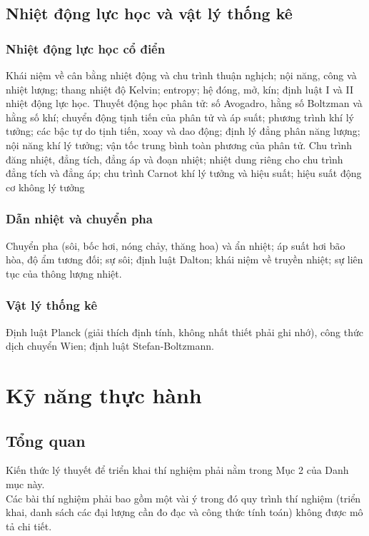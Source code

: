 \documentclass{article}
\begin{document}
\begin{multicols}{2}
\subsection{Nhiệt động lực học và vật lý thống kê}
\subsubsection{Nhiệt động lực học cổ điển}
Khái niệm về cân bằng nhiệt động và chu trình thuận nghịch; nội năng, công và nhiệt lượng; thang nhiệt độ Kelvin; entropy; hệ đóng, mở, kín; định luật I và II nhiệt động lực học. Thuyết động học phân tử: số Avogadro, hằng số Boltzman và hằng số khí; chuyển động tịnh tiến của phân tử và áp suất; phương trình khí lý tưởng; các bậc tự do tịnh tiến, xoay và dao động; định lý đẳng phân năng lượng; nội năng khí lý tưởng; vận tốc trung bình toàn phương của phân tử. Chu trình đăng nhiệt, đẳng tích, đẳng áp và đoạn nhiệt; nhiệt dung riêng cho chu trình đẳng tích và đẳng áp; chu trình Carnot khí lý tưởng và hiệu suất; hiệu suất động cơ không lý tưởng

\subsubsection{Dẫn nhiệt và chuyển pha}
Chuyển pha (sôi, bốc hơi, nóng chảy, thăng hoa) và ẩn nhiệt; áp suất hơi bão hòa, độ ẩm tương đối; sự sôi; định luật Dalton; khái niệm về truyền nhiệt; sự liên tục của thông lượng nhiệt.

\subsubsection{Vật lý thống kê}
Định luật Planck (giải thích định tính, không nhất thiết phải ghi nhớ), công thức dịch chuyển Wien; định luật Stefan-Boltzmann.

\section{Kỹ năng thực hành}
\subsection{Tổng quan}
Kiến thức lý thuyết để triển khai thí nghiệm phải nằm trong Mục 2 của Danh mục này.\\

Các bài thí nghiệm phải bao gồm một vài ý trong đó quy trình thí nghiệm (triển khai, danh sách các đại lượng cần đo đạc và công thức tính toán) không được mô tả chi tiết.\\


\end{multicols}
\end{document}
